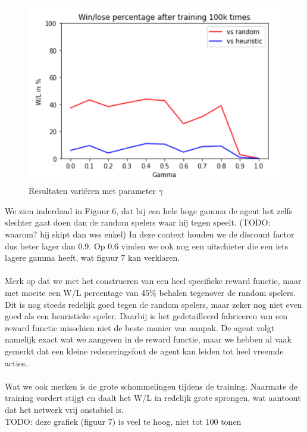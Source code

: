 \documentclass[11pt]{article}
\begin{document}
\begin{figure}[h]
\centering
\includegraphics[scale=0.45]{images/gamma-iteratie-dqn.png}
\caption{Resultaten variëren met parameter $\gamma$}
\end{figure}
We zien inderdaad in Figuur 6, dat bij een hele hoge gamma de agent het zelfs slechter gaat doen dan de random spelers waar hij tegen speelt. (TODO: waarom? hij skipt dan wss enkel) In deze context houden we de discount factor dus beter lager dan 0.9. Op 0.6 vinden we ook nog een uitschieter die een iets lagere gamma heeft, wat figuur 7 kan verklaren.\\\\
Merk op dat we met het construeren van een heel specifieke reward functie, maar met moeite een W/L percentage van 45\% behalen tegenover de random spelers. Dit is nog steeds redelijk goed tegen de random spelers, maar zeker nog niet even goed als een heuristieke speler. Daarbij is het gedetailleerd fabriceren van een reward functie misschien niet de beste manier van aanpak. De agent volgt namelijk exact wat we aangeven in de reward functie, maar we hebben al vaak gemerkt dat een kleine redeneringsfout de agent kan leiden tot heel vreemde acties.\\\\
Wat we ook merken is de grote schommelingen tijdens de training. Naarmate de training vordert stijgt en daalt het W/L in redelijk grote sprongen, wat aantoont dat het netwerk vrij onstabiel is.\\
TODO: deze grafiek (figuur 7) is veel te hoog, niet tot 100 tonen
\end{document}
